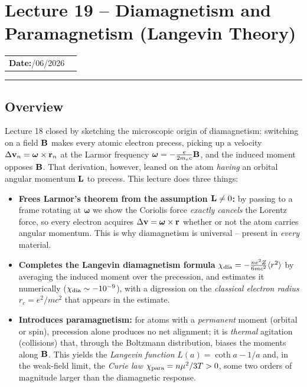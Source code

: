 \section{Lecture 19 -- Diamagnetism and Paramagnetism (Langevin Theory)}\label{sec:lec19}

\begin{center}
\begin{tabular}{ll}
  \textbf{Date:}\quad 09/06/2026 & \\
\end{tabular}
\end{center}
\hrule\vspace{1.5em}

\subsection*{Overview}

Lecture 18 closed by sketching the microscopic origin of diamagnetism: switching on a
field $\mathbf{B}$ makes every atomic electron precess, picking up a velocity
$\Delta\mathbf{v}_n=\boldsymbol{\omega}\times\mathbf{r}_n$ at the Larmor frequency
$\boldsymbol{\omega}=-\tfrac{e}{2m_ec}\mathbf{B}$, and the induced moment opposes $\mathbf{B}$. That
derivation, however, leaned on the atom \emph{having} an orbital angular momentum
$\mathbf{L}$ to precess. This lecture does three things:
\begin{itemize}
  \item \textbf{Frees Larmor's theorem from the assumption $\mathbf{L}\neq0$:} by passing to
        a frame rotating at $\boldsymbol{\omega}$ we show the Coriolis force \emph{exactly
        cancels} the Lorentz force, so every electron acquires
        $\Delta\mathbf{v}=\boldsymbol{\omega}\times\mathbf{r}$ whether or not the atom carries
        angular momentum. This is why diamagnetism is universal -- present in
        \emph{every} material.
  \item \textbf{Completes the Langevin diamagnetism formula}
        $\chi_{\rm dia}=-\tfrac{ne^2Z}{6mc^2}\langle r^2\rangle$ by averaging the induced
        moment over the precession, and estimates it numerically
        ($\chi_{\rm dia}\sim-10^{-9}$), with a digression on the \emph{classical electron
        radius} $r_c=e^2/mc^2$ that appears in the estimate.
  \item \textbf{Introduces paramagnetism:} for atoms with a \emph{permanent} moment
        (orbital or spin), precession alone produces no net alignment; it is
        \emph{thermal} agitation (collisions) that, through the Boltzmann distribution,
        biases the moments along $\mathbf{B}$. This yields the \emph{Langevin function}
        $L(a)=\coth a-1/a$ and, in the weak-field limit, the \emph{Curie law}
        $\chi_{\rm para}=n\mu^2/3T>0$, some two orders of magnitude larger than the
        diamagnetic response.
\end{itemize}

